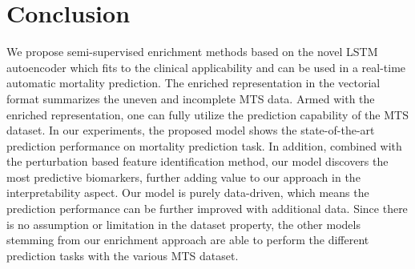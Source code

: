 \iffalse
We proposed models based on LSTMs that can learn good video representations.
First, given that the proposed machine learning method is purely data-driven, our model may vary if starting from different datasets. As more data become available, the whole procedure can easily be repeated to obtain more accurate models.
We does not assume any property about dataset.

In this paper, we considered the identification of COVID-19 cases from X-ray images and proposed a novel semi-supervised deep architecture that can distinguish between the three cases of Healthy, non-COVID pneumonia, COVID-19 infection based on the chest X-ray manifestation of these classes. The proposed methodology is comprised of two modules: 1) the Task-Based Feature Extraction Network (TFEN), and 2) the COVID-19 Identification Network (CIN). 
\fi
\section{Conclusion}
We propose semi-supervised enrichment methods based on the novel LSTM autoencoder which fits to the clinical applicability and can be used in a real-time automatic mortality prediction. The enriched representation in the vectorial format summarizes the uneven and incomplete MTS data. Armed with the enriched representation, one can fully utilize the prediction capability of the MTS dataset. In our experiments, the proposed model shows the state-of-the-art prediction performance on mortality prediction task. In addition, combined with the perturbation based feature identification method, our model discovers the most predictive biomarkers, further adding value to our approach in the interpretability aspect. Our model is purely data-driven, which means the prediction performance can be further improved with additional data. Since there is no assumption or limitation in the dataset property, the other models stemming from our enrichment approach are able to perform the different prediction tasks with the various MTS dataset.
\clearpage